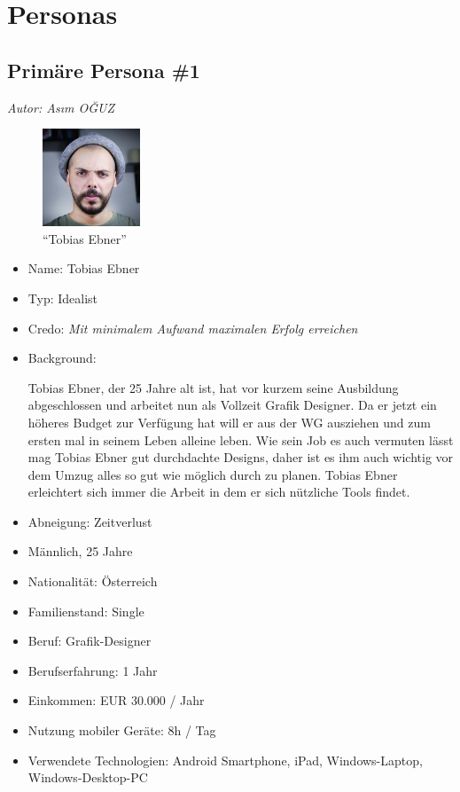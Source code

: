 \documentclass[12pt,paper=a4,oneside,hidelinks,headings=small,captions=heading,captions=nooneline]{scrartcl}
\begin{document}
\section{Personas}
\label{sec:org8566c8f}

\subsection{Primäre Persona \#1}
\label{sec:org85540ab}

\emph{Autor: Asım OĞUZ}

\begin{figure}[htbp]
\centering
\includegraphics[width=110px]{./img/m1_persona_1_idealist.png}
\caption{\label{fig:persona1}"`Tobias Ebner"'}
\end{figure}

\begin{itemize}
\item Name: Tobias Ebner
\item Typ: Idealist
\item Credo: \emph{Mit minimalem Aufwand maximalen Erfolg erreichen}
\item Background:

Tobias Ebner, der 25 Jahre alt ist, hat vor kurzem seine
Ausbildung abgeschlossen und arbeitet nun als Vollzeit Grafik
Designer. Da er jetzt ein höheres Budget zur Verfügung hat will er
aus der WG ausziehen und zum ersten mal in seinem Leben alleine
leben. Wie sein Job es auch vermuten lässt mag Tobias Ebner gut
durchdachte Designs, daher ist es ihm auch wichtig vor dem Umzug
alles so gut wie möglich durch zu planen.  Tobias Ebner erleichtert
sich immer die Arbeit in dem er sich nützliche Tools findet.

\item Abneigung: Zeitverlust
\item Männlich, 25 Jahre
\item Nationalität: Österreich
\item Familienstand: Single
\item Beruf: Grafik-Designer
\item Berufserfahrung: 1 Jahr
\item Einkommen: EUR 30.000 / Jahr
\item Nutzung mobiler Geräte: 8h / Tag
\item Verwendete Technologien: Android Smartphone, iPad, Windows-Laptop,
Windows-Desktop-PC
\end{itemize}
\end{document}
